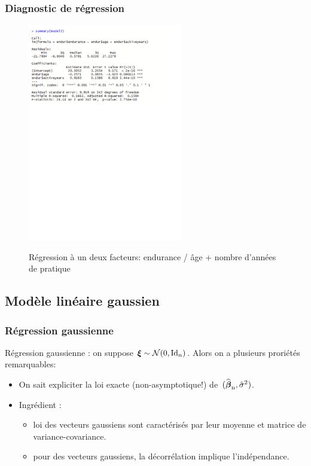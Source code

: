 \begin{frame}
\frametitle{Diagnostic de régression}
\begin{figure}
  \centering
  \includegraphics[width=0.6\textwidth]{summarymodel3}\\
  \caption{Régression à un deux facteurs: endurance / âge + nombre d'années de pratique}
\end{figure}
\end{frame}








\subsection{Modèle linéaire gaussien}

\begin{frame}
\frametitle{Régression gaussienne} \alert{Régression gaussienne} : on
suppose $\boldsymbol{\xi} \sim {\mathcal N}(0,\mathrm{Id}_n)$. Alors on a plusieurs proriétés
remarquables:
\begin{itemize}
\item  On sait expliciter la loi \alert{ exacte} (non-asymptotique!)
de~$(\operatorname{\widehat{\boldsymbol{\beta}}_n},\hat{\sigma}^2)$.\\\vspace{1mm}
\item \alert{Ingrédient} :
\begin{itemize}
\item loi des vecteurs gaussiens sont caractérisés par leur moyenne et matrice de
variance-covariance.
\item pour des vecteurs gaussiens, la décorrélation implique l'indépendance.
\end{itemize}
\end{itemize}
\end{frame}

